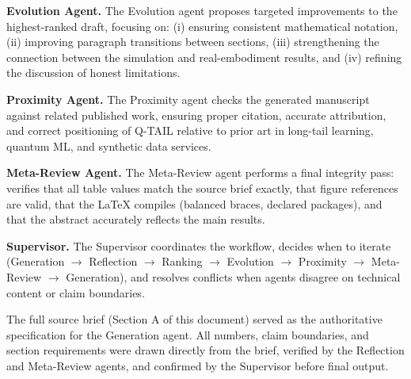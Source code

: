 \documentclass[10pt]{article}
\begin{document}
\medskip\noindent\textbf{Evolution Agent.}  The Evolution agent proposes targeted
improvements to the highest-ranked draft, focusing on: (i) ensuring consistent
mathematical notation, (ii) improving paragraph transitions between sections,
(iii) strengthening the connection between the simulation and real-embodiment results,
and (iv) refining the discussion of honest limitations.

\medskip\noindent\textbf{Proximity Agent.}  The Proximity agent checks the generated
manuscript against related published work, ensuring proper citation, accurate attribution,
and correct positioning of Q-TAIL relative to prior art in long-tail learning, quantum
ML, and synthetic data services.

\medskip\noindent\textbf{Meta-Review Agent.}  The Meta-Review agent performs a final
integrity pass: verifies that all table values match the source brief exactly, that
figure references are valid, that the LaTeX compiles (balanced braces, declared
packages), and that the abstract accurately reflects the main results.

\medskip\noindent\textbf{Supervisor.}  The Supervisor coordinates the workflow,
decides when to iterate (Generation $\rightarrow$ Reflection $\rightarrow$ Ranking
$\rightarrow$ Evolution $\rightarrow$ Proximity $\rightarrow$ Meta-Review $\rightarrow$
Generation), and resolves conflicts when agents disagree on technical content or
claim boundaries.

The full source brief (Section A of this document) served as the authoritative
specification for the Generation agent.  All numbers, claim boundaries, and section
requirements were drawn directly from the brief, verified by the Reflection and
Meta-Review agents, and confirmed by the Supervisor before final output.
\end{document}
